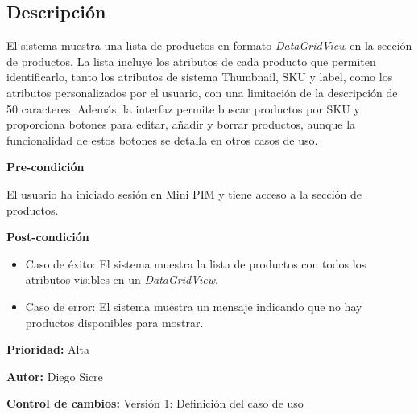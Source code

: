 {}

\subsection*{Descripción}
El sistema muestra una lista de productos en formato \textit{DataGridView} en la sección de productos. La lista incluye los atributos de cada producto que permiten identificarlo, tanto los atributos de sistema Thumbnail, SKU y label, como los atributos personalizados por el usuario, con una limitación de la descripción de 50 caracteres. Además, la interfaz permite buscar productos por SKU y proporciona botones para editar, añadir y borrar productos, aunque la funcionalidad de estos botones se detalla en otros casos de uso.

\vspace{0.15cm}

\textbf{Pre-condición}\par
El usuario ha iniciado sesión en Mini PIM y tiene acceso a la sección de productos.\par
\vspace{0.15cm}

\textbf{Post-condición}
\begin{itemize}
    \item Caso de éxito: El sistema muestra la lista de productos con todos los atributos visibles en un \textit{DataGridView}.
    \item Caso de error: El sistema muestra un mensaje indicando que no hay productos disponibles para mostrar.
\end{itemize}

\textbf{Prioridad: }
Alta
\vspace{0.15cm}

\textbf{Autor: }
Diego Sicre\par
\vspace{0.15cm}

\textbf{Control de cambios: } Versión 1: Definición del caso de uso

